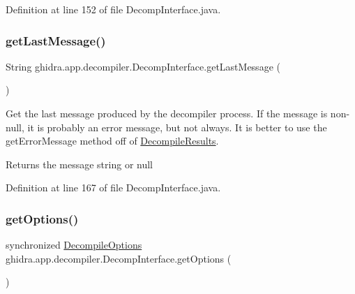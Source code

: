 Definition at line 152 of file Decomp\+Interface.\+java.

\mbox{\label{classghidra_1_1app_1_1decompiler_1_1_decomp_interface_ac555389aec521f55bc520206d9a735be}} 
\subsubsection{\texorpdfstring{getLastMessage()}{getLastMessage()}}
{\footnotesize\ttfamily String ghidra.\+app.\+decompiler.\+Decomp\+Interface.\+get\+Last\+Message (\begin{DoxyParamCaption}{ }\end{DoxyParamCaption})\hspace{0.3cm}{\ttfamily [inline]}}

Get the last message produced by the decompiler process. If the message is non-\/null, it is probably an error message, but not always. It is better to use the get\+Error\+Message method off of \mbox{\hyperlink{classghidra_1_1app_1_1decompiler_1_1_decompile_results}{Decompile\+Results}}. \begin{DoxyReturn}{Returns}
the message string or null 
\end{DoxyReturn}


Definition at line 167 of file Decomp\+Interface.\+java.

\mbox{\label{classghidra_1_1app_1_1decompiler_1_1_decomp_interface_a4a49d6b06c33e71fb1d336703d6b49cb}} 
\subsubsection{\texorpdfstring{getOptions()}{getOptions()}}
{\footnotesize\ttfamily synchronized \mbox{\hyperlink{classghidra_1_1app_1_1decompiler_1_1_decompile_options}{Decompile\+Options}} ghidra.\+app.\+decompiler.\+Decomp\+Interface.\+get\+Options (\begin{DoxyParamCaption}{ }\end{DoxyParamCaption})\hspace{0.3cm}{\ttfamily [inline]}}

